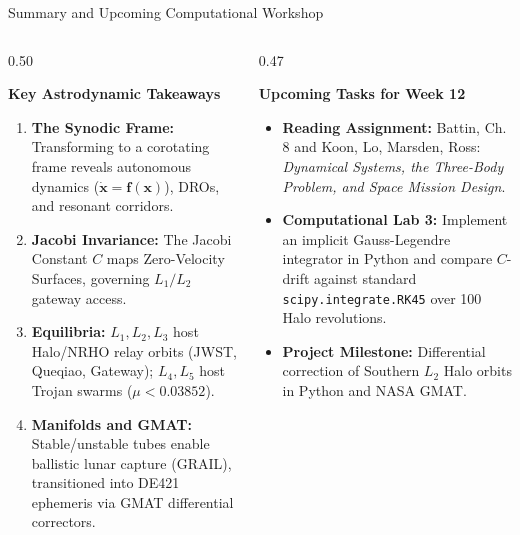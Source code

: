\documentclass[aspectratio=169, 10pt]{beamer}
\begin{document}
\begin{frame}{Summary and Upcoming Computational Workshop}
    \begin{columns}[t]
        \begin{column}{0.50\textwidth}
            \begin{block}{\textbf{Key Astrodynamic Takeaways}}
                \scriptsize
                \begin{enumerate}\setlength{\itemsep}{2pt}
                    \item \textbf{The Synodic Frame:} Transforming to a corotating frame reveals autonomous dynamics ($\dot{\mathbf{x}} = \mathbf{f}(\mathbf{x})$), DROs, and resonant corridors.
                    \item \textbf{Jacobi Invariance:} The Jacobi Constant $C$ maps Zero-Velocity Surfaces, governing $L_1/L_2$ gateway access.
                    \item \textbf{Equilibria:} $L_1, L_2, L_3$ host Halo/NRHO relay orbits (JWST, Queqiao, Gateway); $L_4, L_5$ host Trojan swarms ($\mu < 0.03852$).
                    \item \textbf{Manifolds and GMAT:} Stable/unstable tubes enable ballistic lunar capture (GRAIL), transitioned into DE421 ephemeris via GMAT differential correctors.
                \end{enumerate}
            \end{block}
        \end{column}
        
        \begin{column}{0.47\textwidth}
            \begin{exampleblock}{\textbf{Upcoming Tasks for Week 12}}
                \scriptsize
                \begin{itemize}\setlength{\itemsep}{2pt}
                    \item \textbf{Reading Assignment:} Battin, Ch. 8 and Koon, Lo, Marsden, Ross: \textit{Dynamical Systems, the Three-Body Problem, and Space Mission Design}.
                    \item \textbf{Computational Lab 3:}
                    Implement an implicit Gauss-Legendre integrator in Python and compare $C$-drift against standard \texttt{scipy.integrate.RK45} over 100 Halo revolutions.
                    \item \textbf{Project Milestone:} Differential correction of Southern $L_2$ Halo orbits in Python and NASA GMAT.
                \end{itemize}
            \end{exampleblock}
        \end{column}
    \end{columns}
\end{frame}
\end{document}
